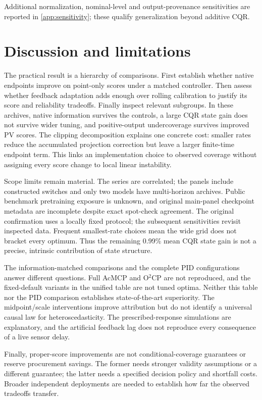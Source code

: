 \documentclass[preprint,11pt]{elsarticle}
\begin{document}
Additional normalization, nominal-level and output-provenance sensitivities are
reported in \ref{app:sensitivity}; these qualify generalization beyond additive CQR.

\section{Discussion and limitations}
The practical result is a hierarchy of comparisons. First establish whether native
endpoints improve on point-only scores under a matched controller. Then assess
whether feedback adaptation adds enough over rolling calibration to justify its
score and reliability tradeoffs. Finally inspect relevant subgroups. In these
archives, native information survives the controls, a large CQR state gain does not
survive wider tuning, and positive-output undercoverage survives improved PV scores.
The clipping decomposition explains one concrete cost: smaller rates reduce the
accumulated projection correction but leave a larger finite-time endpoint term.
This links an implementation choice to observed coverage without assigning every
score change to local linear instability.

Scope limits remain material. The series are correlated; the panels include constructed
switches and only two models have multi-horizon archives. Public benchmark pretraining
exposure is unknown, and original main-panel checkpoint metadata are incomplete despite
exact spot-check agreement. The original confirmation uses a locally fixed protocol;
the subsequent sensitivities revisit inspected data. Frequent smallest-rate choices
mean the wide grid does not bracket every optimum. Thus the remaining 0.99\% mean
CQR state gain is not a precise, intrinsic contribution of state structure.

The information-matched comparisons and the complete PID configurations answer
different questions. Full AcMCP and O$^2$CP are not reproduced, and the fixed-default
variants in the unified table are not tuned optima. Neither this table nor the PID
comparison establishes state-of-the-art superiority. The midpoint/scale interventions
improve attribution but do not identify a universal causal law for heteroscedasticity.
The prescribed-response simulations are explanatory, and the artificial feedback lag
does not reproduce every consequence of a live sensor delay.

Finally, proper-score improvements are not conditional-coverage guarantees or reserve
procurement savings. The former needs stronger validity assumptions or a different
guarantee; the latter needs a specified decision policy and shortfall costs. Broader
independent deployments are needed to establish how far the observed tradeoffs transfer.
\end{document}
